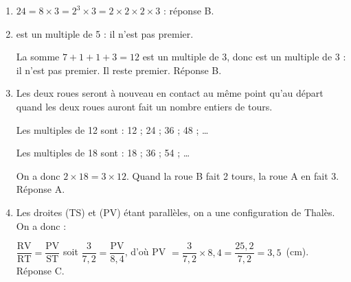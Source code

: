 
\medskip

%
%
%
%
\begin{enumerate}
\item $24 = 8 \times 3 = 2^3 \times 3 = 2\times 2\times 2\times 3$ : réponse B.
\item {} est un multiple de 5 : il n'est pas premier.

La somme $7 + 1 + 1 + 3 = 12$ est un multiple de 3, donc  est un multiple de 3 : il n'est pas premier. Il reste  premier. Réponse B.
\item Les deux roues seront à nouveau en contact au même point qu'au départ quand les deux roues auront fait un nombre entiers de tours.

Les multiples de 12 sont : 12 ; 24 ; 36 ; 48 ; \ldots

Les multiples de 18 sont : 18 ; 36 ; 54 ; \ldots

On a donc $2 \times 18 = 3 \times 12$. Quand la roue B fait 2 tours, la roue A en fait 3. Réponse A.
\item Les droites (TS) et (PV) étant parallèles, on a une configuration de Thalès. On a donc :

$\dfrac{\text{RV}}{\text{RT}} = \dfrac{\text{PV}}{\text{ST}}$ soit $\dfrac{3}{7,2} = \dfrac{\text{PV}}{8,4}$, d'où PV $ = \dfrac{3}{7,2} \times 8,4 = \dfrac{25,2}{7,2} = 3,5$~(cm). Réponse C.
\end{enumerate}

\bigskip

